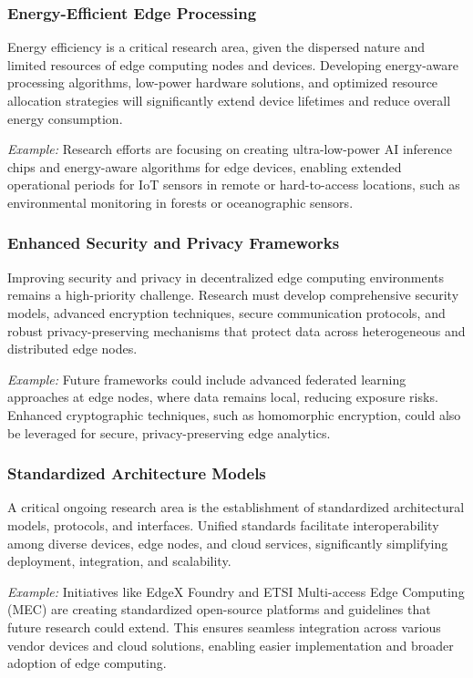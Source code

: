 \documentclass[runningheads]{llncs}
\begin{document}
\subsubsection{Energy-Efficient Edge Processing}
Energy efficiency is a critical research area, given the dispersed nature and limited resources of edge computing nodes and devices. Developing energy-aware processing algorithms, low-power hardware solutions, and optimized resource allocation strategies will significantly extend device lifetimes and reduce overall energy consumption.

\textit{Example:} Research efforts are focusing on creating ultra-low-power AI inference chips and energy-aware algorithms for edge devices, enabling extended operational periods for IoT sensors in remote or hard-to-access locations, such as environmental monitoring in forests or oceanographic sensors.

\subsubsection{Enhanced Security and Privacy Frameworks}
Improving security and privacy in decentralized edge computing environments remains a high-priority challenge. Research must develop comprehensive security models, advanced encryption techniques, secure communication protocols, and robust privacy-preserving mechanisms that protect data across heterogeneous and distributed edge nodes.

\textit{Example:} Future frameworks could include advanced federated learning approaches at edge nodes, where data remains local, reducing exposure risks. Enhanced cryptographic techniques, such as homomorphic encryption, could also be leveraged for secure, privacy-preserving edge analytics.

\subsubsection{Standardized Architecture Models}
A critical ongoing research area is the establishment of standardized architectural models, protocols, and interfaces. Unified standards facilitate interoperability among diverse devices, edge nodes, and cloud services, significantly simplifying deployment, integration, and scalability.

\textit{Example:} Initiatives like EdgeX Foundry and ETSI Multi-access Edge Computing (MEC) are creating standardized open-source platforms and guidelines that future research could extend. This ensures seamless integration across various vendor devices and cloud solutions, enabling easier implementation and broader adoption of edge computing.
\end{document}
